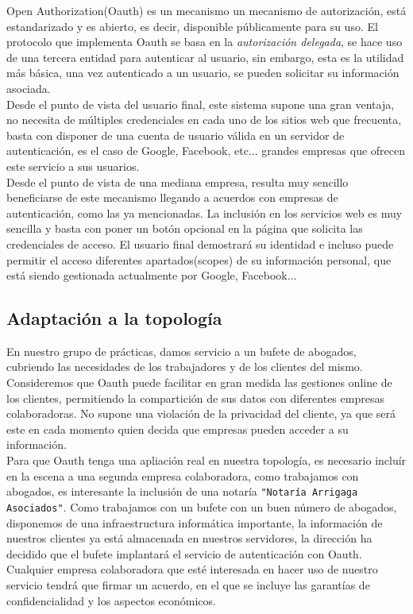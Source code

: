 \documentclass[a4,12pt,onecolum]{article}
\begin{document}
Open Authorization(Oauth) es un mecanismo un mecanismo de autorización, está estandarizado y es abierto, es decir, disponible públicamente para su uso. El protocolo que implementa Oauth se basa en la \emph{autorización delegada}, se hace uso de una tercera entidad para autenticar al usuario, sin embargo, esta es la utilidad más básica, una vez autenticado a un usuario, se pueden solicitar su información asociada. \\

Desde el punto de vista del usuario final, este sistema supone una gran ventaja, no necesita de múltiples credenciales en cada uno de los sitios web que frecuenta, basta con disponer de una cuenta de usuario válida en un servidor de autenticación, es el caso de Google, Facebook, etc... grandes empresas que ofrecen este servicio a sus usuarios. \\

Desde el punto de vista de una mediana empresa, resulta muy sencillo beneficiarse de este mecanismo llegando a acuerdos con empresas de autenticación, como las ya mencionadas. La inclusión en los servicios web es muy sencilla y basta con poner un botón opcional en la página que solicita las credenciales de acceso. El usuario final demostrará su identidad e incluso puede permitir el acceso diferentes apartados(scopes) de su información personal, que está siendo gestionada actualmente por Google, Facebook...


\subsection{Adaptación a la topología}
En nuestro grupo de prácticas, damos servicio a un bufete de abogados, cubriendo las necesidades de los trabajadores y de los clientes del mismo. Consideremos que Oauth puede facilitar en gran medida las gestiones online de los clientes, permitiendo la compartición de sus datos con diferentes empresas colaboradoras. No supone una violación de la privacidad del cliente, ya que será este en cada momento quien decida que empresas pueden acceder a su información.	\\

Para que Oauth tenga una apliación real en nuestra topología, es necesario incluír en la escena a una segunda empresa colaboradora, como trabajamos con abogados, es interesante la inclusión de una notaría \texttt{"Notaría Arrigaga Asociados"}. Como trabajamos con un bufete con un buen número de abogados, disponemos de una infraestructura informática  importante, la información de nuestros clientes ya está almacenada en nuestros servidores, la dirección ha decidido que el bufete implantará el servicio de autenticación con Oauth. Cualquier empresa colaboradora que esté interesada en hacer uso de nuestro servicio tendrá que firmar un acuerdo, en el que se incluye las garantías de confidencialidad y los aspectos económicos.	\\
\end{document}
